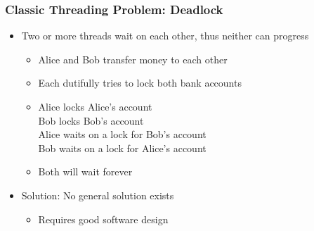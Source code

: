 \begin{slide}
\frametitle{Classic Threading Problem: Deadlock}

\begin{itemize}
\item Two or more threads wait on each other, thus neither can progress
  \begin{itemize}
  \item Alice and Bob transfer money to each other
  \item Each dutifully tries to lock both bank accounts
  \item [] \vspace{0.5em}
  \footnotesize{Alice locks Alice's account} \\
  \hspace{1cm}\footnotesize{Bob locks Bob's account} \\
  \footnotesize{Alice waits on a lock for Bob's account} \\
  \hspace{1cm}\footnotesize{Bob waits on a lock for Alice's account} \\
  \end{itemize}
  \begin{itemize}
  \item Both will wait forever
  \end{itemize}

\vspace{1em}
\item Solution: No general solution exists
  \begin{itemize}
  \item Requires good software design
 \end{itemize}
\end{itemize}

\end{slide}


